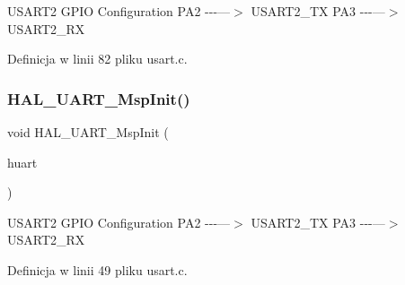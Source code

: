 U\+S\+A\+R\+T2 G\+P\+IO Configuration P\+A2 -\/-\/-\/---$>$ U\+S\+A\+R\+T2\+\_\+\+TX P\+A3 -\/-\/-\/---$>$ U\+S\+A\+R\+T2\+\_\+\+RX

Definicja w linii 82 pliku usart.\+c.

\mbox{\label{group___u_a_r_t___exported___functions___group1_ga0e553b32211877322f949b14801bbfa7}} 
\subsubsection{\texorpdfstring{H\+A\+L\+\_\+\+U\+A\+R\+T\+\_\+\+Msp\+Init()}{HAL\_UART\_MspInit()}}
{\footnotesize\ttfamily void H\+A\+L\+\_\+\+U\+A\+R\+T\+\_\+\+Msp\+Init (\begin{DoxyParamCaption}\item[{\hyperlink{group___u_a_r_t___exported___types_ga7adf4f3e4c3ecde572be5925c915a967}{U\+A\+R\+T\+\_\+\+Handle\+Type\+Def} $\ast$}]{huart }\end{DoxyParamCaption})}

U\+S\+A\+R\+T2 G\+P\+IO Configuration P\+A2 -\/-\/-\/---$>$ U\+S\+A\+R\+T2\+\_\+\+TX P\+A3 -\/-\/-\/---$>$ U\+S\+A\+R\+T2\+\_\+\+RX

Definicja w linii 49 pliku usart.\+c.

